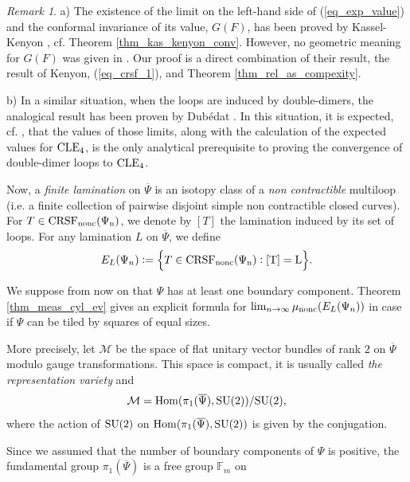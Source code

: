 \documentclass[12pt]{article}
\numberwithin{equation}{section}
\theoremstyle{theorem}
\theoremstyle{definition}
\theoremstyle{remark}
\newtheorem{rem}[thm]{Remark}
\begin{document}
	\begin{rem}\label{rem_exp_value}
		a) The existence of the limit on the left-hand side of (\ref{eq_exp_value}) and the conformal invariance of its value, $G(F)$, has been proved by Kassel-Kenyon \cite[Theorem 17]{KassKenyon}, cf. Theorem \ref{thm_kas_kenyon_conv}. 
		However, no geometric meaning for $G(F)$ was given in \cite{KassKenyon}.
		Our proof is a direct combination of their result, the result of Kenyon, (\ref{eq_crsf_1}), and Theorem \ref{thm_rel_as_compexity}.
		\par 
		b) In a similar situation, when the loops are induced by double-dimers, the analogical result has been proven by Dubédat \cite[Theorem 1]{DubedDDimersCLE}. In this situation, it is expected, cf. \cite[Corollary 3]{DubedDDimersCLE}, that the values of those limits, along with the calculation of the expected values for ${\rm{CLE}}_4$, is the only analytical prerequisite to proving the convergence of double-dimer loops to ${\rm{CLE}}_4$.
	\end{rem}
	\par Now, a \textit{finite lamination} on $\overline{\Psi}$ is an isotopy class of a \textit{non contractible} multiloop (i.e. a finite collection of pairwise disjoint simple non contractible closed curves).
	For $T \in \rm{CRSF}_{{\rm{nonc}}}(\Psi_n)$, we denote by $[T]$ the lamination induced by its set of loops.
	For any lamination $L$ on $\overline{\Psi}$, we define
	\begin{equation}
		E_L(\Psi_n) := \Big\{ 
			T \in \rm{CRSF}_{{\rm{nonc}}}(\Psi_n) : [T] = L
		\Big\}.
	\end{equation}
	\par We suppose from now on that $\Psi$ has at least one boundary component. Theorem \ref{thm_meas_cyl_ev} gives an explicit formula for $\lim_{n \to \infty} \mu_{\rm{nonc}}(E_L(\Psi_n))$ in case if $\Psi$ can be tiled by squares of equal sizes.
	\par 
	More precisely, let $\mathcal{M}$ be the space of flat unitary vector bundles of rank $2$ on $\overline{\Psi}$ modulo gauge transformations. 
	This space is compact, it is usually called \textit{the representation variety} and
	\begin{equation}
		\mathcal{M} = {\rm{Hom}}(\pi_1(\overline{\Psi}), {\rm{SU}}(2)) / {\rm{SU}}(2),
	\end{equation}
	where the action of ${\rm{SU}}(2)$ on ${\rm{Hom}}(\pi_1(\overline{\Psi}), {\rm{SU}}(2))$ is given by the conjugation.
	\par 
	Since we assumed that the number of boundary components of $\Psi$ is positive, the fundamental group $\pi_1(\overline{\Psi})$ is a free group $\mathbb{F}_m$ on
\end{document}
